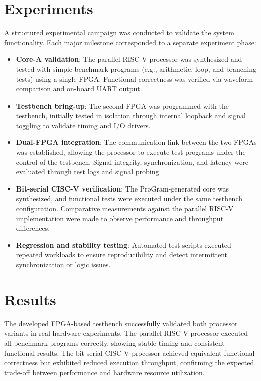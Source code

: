 \documentclass[10pt,twocolumn]{article}
\begin{document}
\section{Experiments}
A structured experimental campaign was conducted to validate the system functionality. Each major milestone corresponded to a separate experiment phase:
\begin{itemize}
  \item \textbf{Core-A validation}: The parallel RISC-V processor was synthesized and tested with simple benchmark programs (e.g., arithmetic, loop, and branching tests) using a single FPGA. Functional correctness was verified via waveform comparison and on-board UART output.
  \item \textbf{Testbench bring-up}: The second FPGA was programmed with the testbench, initially tested in isolation through internal loopback and signal toggling to validate timing and I/O drivers.
  \item \textbf{Dual-FPGA integration}: The communication link between the two FPGAs was established, allowing the processor to execute test programs under the control of the testbench. Signal integrity, synchronization, and latency were evaluated through test logs and signal probing.
  \item \textbf{Bit-serial CISC-V verification}: The ProGram-generated core was synthesized, and functional tests were executed under the same testbench configuration. Comparative measurements against the parallel RISC-V implementation were made to observe performance and throughput differences.
  \item \textbf{Regression and stability testing}: Automated test scripts executed repeated workloads to ensure reproducibility and detect intermittent synchronization or logic issues.
\end{itemize}

\section{Results}
The developed FPGA-based testbench successfully validated both processor variants in real hardware experiments.  
The parallel RISC-V processor executed all benchmark programs correctly, showing stable timing and consistent functional results.  
The bit-serial CISC-V processor achieved equivalent functional correctness but exhibited reduced execution throughput, confirming the expected trade-off between performance and hardware resource utilization.
\end{document}
